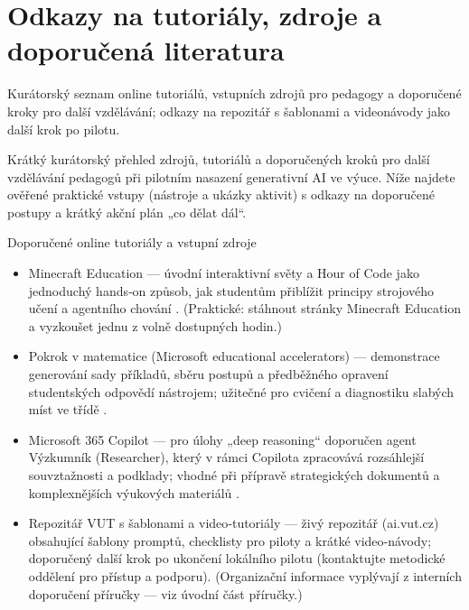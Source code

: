 \documentclass{report}%
\begin{document}
%
\section{Odkazy na tutoriály, zdroje a doporučená literatura}%
Kurátorský seznam online tutoriálů, vstupních zdrojů pro pedagogy a doporučené kroky pro další vzdělávání; odkazy na repozitář s šablonami a videonávody jako další krok po pilotu.%


%
Krátký kurátorský přehled zdrojů, tutoriálů a doporučených kroků pro další vzdělávání pedagogů při pilotním nasazení generativní AI ve výuce. Níže najdete ověřené praktické vstupy (nástroje a ukázky aktivit) s odkazy na doporučené postupy a krátký akční plán „co dělat dál“.

Doporučené online tutoriály a vstupní zdroje
\begin{itemize}
  \item Minecraft Education — úvodní interaktivní světy a Hour of Code jako jednoduchý hands‑on způsob, jak studentům přiblížit principy strojového učení a agentního chování \cite{kb_ai_101_tipu_pdf_04e4a115_page_15_2}. (Praktické: stáhnout stránky Minecraft Education a vyzkoušet jednu z volně dostupných hodin.)
  \item Pokrok v matematice (Microsoft educational accelerators) — demonstrace generování sady příkladů, sběru postupů a předběžného opravení studentských odpovědí nástrojem; užitečné pro cvičení a diagnostiku slabých míst ve třídě \cite{kb_ai_101_tipu_pdf_04e4a115_page_8_1}.
  \item Microsoft 365 Copilot — pro úlohy „deep reasoning“ doporučen agent Výzkumník (Researcher), který v rámci Copilota zpracovává rozsáhlejší souvztažnosti a podklady; vhodné při přípravě strategických dokumentů a komplexnějších výukových materiálů \cite{kb_ai_101_tipu_pdf_04e4a115_page_48_1}.
  \item Repozitář VUT s šablonami a video‑tutoriály — živý repozitář (ai.vut.cz) obsahující šablony promptů, checklisty pro piloty a krátké video‑návody; doporučený další krok po ukončení lokálního pilotu (kontaktujte metodické oddělení pro přístup a podporu). (Organizační informace vyplývají z interních doporučení příručky — viz úvodní část příručky.)
\end{itemize}
\end{document}
